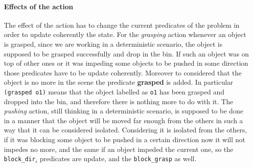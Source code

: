 \paragraph{Effects of the action}
The effect of the action has to change the current predicates of the problem in order to update coherently the state. For the \textit{grasping} action whenever an object is grasped, since we are working in a deterministic scenario, the object is supposed to be grasped successfully and drop in the bin. If such an object was on top of other ones or it was impeding some objects to be pushed in some direction those predicates have to be update coherently. Moreover to considered that the object is no more in the scene the predicate \textbf{grasped} is added. In particular \texttt{(grasped o1)} means that the object labelled as \texttt{o1} has been grasped and dropped into the bin, and therefore there is nothing more to do with it. The \textit{pushing} action, still thinking in a deterministic scenario, is supposed to be done in a manner that the object will be moved far enough from the others in such a way that it can be considered isolated. Considering it is isolated from the others, if it was blocking some object to be pushed in a certain direction now it will not impedes no more, and the same if an object impeded the current one, so the \texttt{block\_dir}$_i$ predicates are update, and the \texttt{block\_grasp} as well.  

